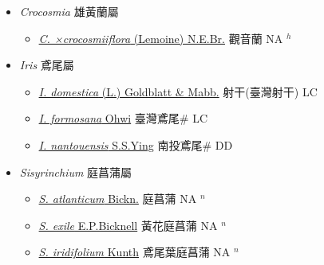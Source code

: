 
  \begin{itemize}
 \item[] \textit{Crocosmia} 雄黃蘭屬
                    
  \begin{itemize}
        \item[] \href{http://www.theplantlist.org/tpl1.1/search?q=Crocosmia+×crocosmiiflora}{\textit{C. ×crocosmiiflora} (Lemoine) N.E.Br.}   觀音蘭 NA $^h$
  \end{itemize}
 \item[] \textit{Iris} 鳶尾屬
                    
  \begin{itemize}
        \item[] \href{http://www.theplantlist.org/tpl1.1/search?q=Iris+domestica}{\textit{I. domestica} (L.) Goldblatt \& Mabb.}        射干(臺灣射干)   LC
        \item[] \href{http://www.theplantlist.org/tpl1.1/search?q=Iris+formosana}{\textit{I. formosana} Ohwi}   臺灣鳶尾\# LC
        \item[] \href{http://www.theplantlist.org/tpl1.1/search?q=Iris+nantouensis}{\textit{I. nantouensis} S.S.Ying}   南投鳶尾\# DD
  \end{itemize}
 \item[] \textit{Sisyrinchium} 庭菖蒲屬
                    
  \begin{itemize}
        \item[] \href{http://www.theplantlist.org/tpl1.1/search?q=Sisyrinchium+atlanticum}{\textit{S. atlanticum} Bickn.}   庭菖蒲 NA $^n$
        \item[] \href{http://www.theplantlist.org/tpl1.1/search?q=Sisyrinchium+exile}{\textit{S. exile} E.P.Bicknell}     黃花庭菖蒲 NA $^n$
        \item[] \href{http://www.theplantlist.org/tpl1.1/search?q=Sisyrinchium+iridifolium}{\textit{S. iridifolium} Kunth}   鳶尾葉庭菖蒲 NA $^n$
  \end{itemize}
  \end{itemize}
